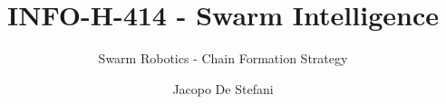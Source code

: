 \documentclass{beamer}
\author{Jacopo De Stefani}
\title{INFO-H-414 - Swarm Intelligence}
\subtitle{Swarm Robotics - Chain Formation Strategy}
\institute{Universite' Libre de Bruxelles}
\begin{document}
\begin{frame}[t,plain]
\titlepage
\end{frame}


\end{document}
